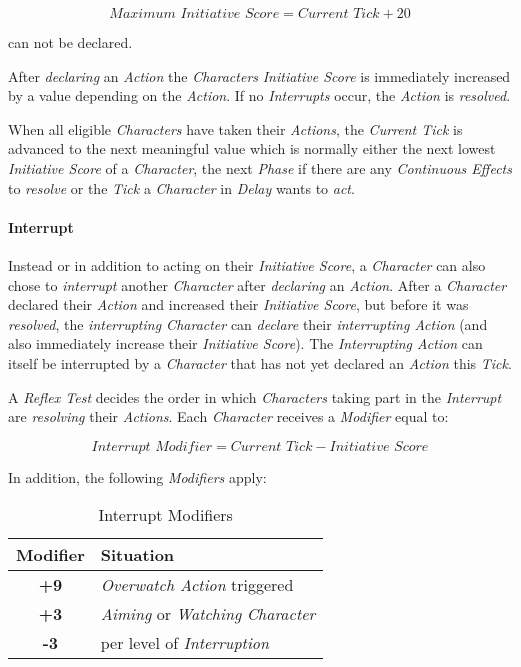 \begin{equation}
    \textit{Maximum Initiative Score} = \textit{Current Tick} + 20
\end{equation}

can not be declared.

After \emph{declaring} an \emph{Action} the \emph{Characters} \emph{Initiative Score}
is immediately increased by a value depending on the \emph{Action}. If no
\emph{Interrupts} occur, the \emph{Action} is \emph{resolved}.

When all eligible \emph{Characters} have taken their \emph{Actions}, the
\emph{Current Tick} is advanced to the next meaningful value which is normally
either the next lowest \emph{Initiative Score} of a \emph{Character}, the next
\emph{Phase} if there are any \emph{Continuous Effects} to \emph{resolve} or the
\emph{Tick} a \emph{Character} in \emph{Delay} wants to \emph{act}.


\paragraph{Interrupt}
Instead or in addition to acting on their \emph{Initiative Score}, a \emph{Character}
can also chose to \emph{interrupt} another \emph{Character} after \emph{declaring} an
\emph{Action}. After a \emph{Character} declared their \emph{Action} and
increased their \emph{Initiative Score},
but before it was \emph{resolved}, the \emph{interrupting Character} can
\emph{declare} their \emph{interrupting Action} (and also immediately increase their
\emph{Initiative Score}).
The \emph{Interrupting Action} can itself be interrupted by a
\emph{Character} that has not yet declared an \emph{Action} this \emph{Tick}.

A \emph{Reflex Test} decides the order in which \emph{Characters} taking part in
the \emph{Interrupt} are \emph{resolving} their \emph{Actions}. Each \emph{Character}
receives a \emph{Modifier} equal to:

\begin{equation}
    \textit{Interrupt Modifier} = \textit{Current Tick} - \textit{Initiative Score}
\end{equation}

In addition, the following \emph{Modifiers} apply:
\begin{table}[htb]
    \caption[Interrupt Modifiers]{Interrupt Modifiers}
    \label{tab:interrupt modifiers}
    \centering
    \begin{tabular}{cl}
        \toprule
        \textbf{Modifier} & \textbf{Situation}                                \\
        \midrule
        \textbf{+9}       & \emph{Overwatch Action} triggered                 \\
        \textbf{+3}       & \emph{Aiming} or \emph{Watching} \emph{Character} \\
        \textbf{-3}       & per level of \emph{Interruption}                  \\
        \bottomrule
    \end{tabular}
\end{table}


